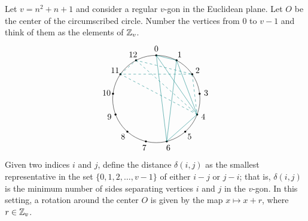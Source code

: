 \begin{xmpl}\label{xmpl:cyclic-planes}{}
    Let $v=n^2+n+1$ and consider a regular $v$-gon in the Euclidean plane. Let $O$ be the center of the circumscribed circle. Number the vertices from $0$ to $v-1$ and think of them as the elements of $\mathbb{Z}_v$.
    \begin{equation}\label{picture:cyclic-13}%
        \begin{tikzpicture}[
            scale=0.8,
            baseline=(center_ref.base)]
            \coordinate (center_ref) at (0,0);
            \def\r{2.3}
            \draw (0,0) circle (\r);
            
            \foreach \i in {0,...,12} {
                \pgfmathsetmacro{\angle}{90 - \i * 360 / 13}
                
                \pgfmathsetmacro{\x}{\r*cos(\angle)}
                \pgfmathsetmacro{\y}{\r*sin(\angle)}
                
                \coordinate (P\i) at: (\x, \y);

                \fill (P\i) circle (1.5pt);
                
                \pgfmathsetmacro{\labelx}{1.15 * \x}
                \pgfmathsetmacro{\labely}{1.15 * \y}

                \node at (\labelx, \labely) {\i};
            }
            \draw[teal]
                (P0) -- (P1) -- (P4) -- (P0) -- (P6) -- (P4);
            \draw[teal] (P1) -- (P6);

            \draw[teal,dashed]
                (P11) -- (P12) -- (P2) -- (P11) -- (P4) -- (P2);
            \draw[teal,dashed] (P12) -- (P4);
        \end{tikzpicture}
    \end{equation}
    Given two indices $i$ and $j$, define the distance $\delta(i,j)$ as the smallest representative in the set $\{0,1,2,\dots,v-1\}$ of either $i-j$ or $j-i$; that is, $\delta(i,j)$ is the minimum number of sides separating vertices $i$ and $j$ in the $v$-gon. In this setting, a rotation around the center $O$ is given by the map $x \mapsto x + r$, where $r\in\mathbb{Z}_v$.
    

\end{xmpl}
